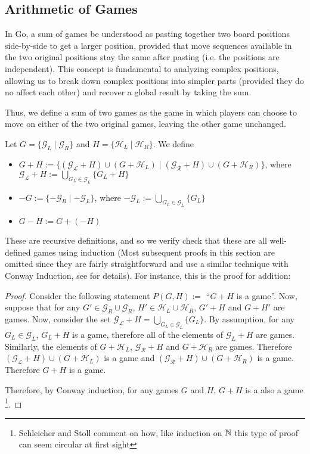 \documentclass[../math194_paper.tex]{subfiles}
\begin{document}
\subsection{Arithmetic of Games} 

In Go, a sum of games be understood as pasting together two board positions side-by-side to 
get a larger position, provided that move sequences available in the two original positions 
stay the same after pasting (i.e. the positions are independent). This concept is fundamental 
to analyzing complex positions, allowing us to break down complex positions into simpler 
parts (provided they do no affect each other) and recover a global result by taking the sum.

Thus, we define a sum of two games as the game in which players
can choose to move on either of the two original games, leaving the other game unchanged.
\begin{definition} Let $G = \{\mathcal{G}_L \mid \mathcal{G}_R\}$
and  $H = \{\mathcal{H}_L \mid \mathcal{H}_R\}$. We define
\begin{itemize}
    \item $G + H := \{ (\mathcal{G_L} + H) \cup (G + \mathcal{H}_L) \mid (\mathcal{G_R} + H) \cup (G + \mathcal{H}_R)\}$, 
    where $\mathcal{G_L} + H := \bigcup_{G_L \in \mathcal{G}_L} \{G_L + H \}$
    \item $-G := \{-\mathcal{G}_R \mid -\mathcal{G}_L \}$, where 
    $-\mathcal{G}_L := \bigcup_{G_L \in \mathcal{G}_L} \{G_L \}$ 
    \item $G - H := G + (-H)$
\end{itemize}
\end{definition}
These are recursive definitions, and so we verify check that these are all well-defined 
games using induction (Most subsequent
proofs in this section are omitted since they are fairly straightforward and use 
a similar technique with Conway Induction, see \cite[\S 2]{schleicher2006introduction} for details).
For instance, this is the proof for addition:
\begin{proof}
    Consider the following statement  $P(G,H) :=$ ``$G + H$ is a game''. Now, suppose that for any 
    $G' \in \mathcal{G}_R \cup \mathcal{G}_R$, $H' \in \mathcal{H}_L \cup \mathcal{H}_R$,
    $G' + H$ and $G + H'$ are games. Now, consider the set $\mathcal{G_L} + H = \bigcup_{G_L \in \mathcal{G}_L} \{G_L \}$. By assumption, for any $G_L \in \mathcal{G}_L$, $G_L + H$ is a game, 
    therefore all of the elements of $\mathcal{G}_L + H$ are games. Similarly, the elements of 
    $G + \mathcal{H}_L$, $\mathcal{G_R} + H$ and $G + \mathcal{H}_R$ are games. Therefore 
    $(\mathcal{G_L} + H) \cup (G + \mathcal{H}_L)$ is a game and $(\mathcal{G_R} + H) \cup (G + \mathcal{H}_R)$ is a game. Therefore $G+H$ is a game. 
    
    Therefore, by Conway induction, for any games $G$ and $H$, $G+H$ is a also a game
    \footnote{Schleicher and Stoll comment on how, like induction on $\mathbb{N}$ 
    this type of proof can seem circular at first sight}.
\end{proof}
\end{document}
